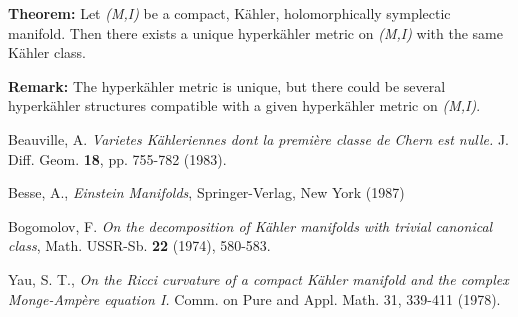 \documentclass[12pt]{article}
\begin{document}
{\bf Theorem:} \label{_Calabi-Yau_Theorem_}
Let {\it (M,I)} be a compact, K\"ahler, holomorphically
symplectic manifold. Then there exists a unique
hyperk\"ahler metric on {\it (M,I)} with the same K\"ahler class.

\hfill

{\bf Remark:}
The hyperk\"ahler metric is unique, but there could
be several hyperk\"ahler structures compatible with
a given hyperk\"ahler metric on {\it (M,I)}.

{\small
\begin{thebibliography}{6666}

 Beauville, A. {\em 
Varietes K\"ahleriennes dont la premi\`ere classe de Chern est
nulle.}  J. Diff. Geom. {\bf 18}, pp. 755-782 (1983).

Besse, 
A., {\em Einstein Manifolds}, Springer-Verlag, New York (1987)

Bogomolov, F. {\em On the decomposition of 
K\"ahler manifolds with trivial canonical class}, Math. USSR-Sb.
{\bf 22} (1974), 580-583.

Yau, S. T., {\em On the Ricci curvature of a compact K\"ahler manifold 
and the complex Monge-Amp\`ere equation I.}  Comm. on Pure and Appl.
Math. 31, 339-411 (1978).

\end{thebibliography}

}%
\end{document}
